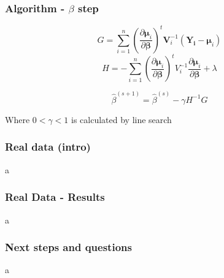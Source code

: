 \documentclass{beamer}
\begin{document}
\begin{frame}
\frametitle{Algorithm - $\beta$ step}

\[G =  \sum_{i = 1}^n  \left(\frac{\partial  \boldsymbol\mu_i }{\partial \boldsymbol\beta }\right)^t\mathbf{V}_i^{-1}(\mathbf{Y_i} - \boldsymbol\mu_i)\]
\[H = - \sum_{i=1}^n \left(\frac{\partial  \boldsymbol\mu_i }{\partial \boldsymbol\beta }\right)^t V_i ^{-1} \frac{\partial  \boldsymbol\mu_i }{\partial \boldsymbol\beta } + \lambda \]

\[\hat\beta^{(s +1)} = \hat\beta^{(s)} - \gamma H ^{-1} G \]

Where $0 < \gamma < 1$ is calculated by line search

\end{frame}

\begin{frame}
\frametitle{Real data (intro)}
a
\end{frame}

\begin{frame}
\frametitle{Real Data - Results}
a
\end{frame}

\begin{frame}
\frametitle{Next steps and questions}
a
\end{frame}



  
\end{document}

